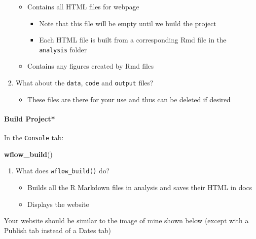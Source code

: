 \documentclass[openany]{article}
\newenvironment{Shaded}{\begin{snugshade}}{\end{snugshade}}
\newcommand{\KeywordTok}[1]{\textcolor[rgb]{0.13,0.29,0.53}{\textbf{#1}}}
\newcommand{\NormalTok}[1]{#1}
\providecommand{\tightlist}{%
  \setlength{\itemsep}{0pt}\setlength{\parskip}{0pt}}
\let\oldparagraph\paragraph
\renewcommand{\paragraph}[1]{\oldparagraph{#1}\mbox{}}
\begin{document}
\begin{enumerate}
  \begin{itemize}
  \tightlist
  \item
    Contains all HTML files for webpage

    \begin{itemize}
    \tightlist
    \item
      Note that this file will be empty until we build the project
    \item
      Each HTML file is built from a corresponding Rmd file in the \texttt{analysis} folder
    \end{itemize}
  \item
    Contains any figures created by Rmd files
  \end{itemize}
\item
  What about the \texttt{data}, \texttt{code} and \texttt{output} files?

  \begin{itemize}
  \tightlist
  \item
    These files are there for your use and thus can be deleted if desired
  \end{itemize}
\end{enumerate}

\hypertarget{build-project}{%
\paragraph{Build Project*}\label{build-project}}

In the \texttt{Console} tab:

\begin{Shaded}
\begin{Highlighting}[]
\KeywordTok{wflow_build}\NormalTok{()}
\end{Highlighting}
\end{Shaded}

\begin{enumerate}
\def\labelenumi{\arabic{enumi}.}
\tightlist
\item
  What does \texttt{wflow\_build()} do?

  \begin{itemize}
  \tightlist
  \item
    Builds all the R Markdown files in analysis and saves their HTML in docs
  \item
    Displays the website
  \end{itemize}
\end{enumerate}

Your website should be similar to the image of mine shown below (except with a Publish tab instead of a Dates tab)
\end{document}
